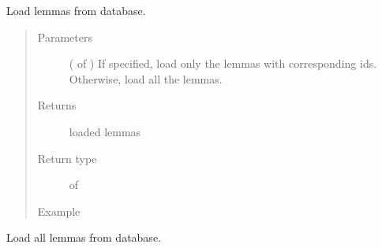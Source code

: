 \documentclass[letterpaper,10pt,english]{sphinxmanual}
\begin{document}
\begin{fulllineitems}
\label{\detokenize{index:loacore.load.lemma_load.load_lemmas}}
Load lemmas from database.
\begin{quote}\begin{description}
\item[{Parameters}] \leavevmode
{} ( of ) \textendash{} If specified, load only the lemmas with corresponding ids. Otherwise, load all the lemmas.

\item[{Returns}] \leavevmode
loaded lemmas

\item[{Return type}] \leavevmode
{} of 

\item[{Example}] \leavevmode
\end{description}\end{quote}

Load all lemmas from database.

%
\begin{sphinxVerbatim}[commandchars=\\\{\}]
   
  
\PYG{p}{[}\PYG{p}{]}
\end{sphinxVerbatim}

\end{fulllineitems}

\end{document}
